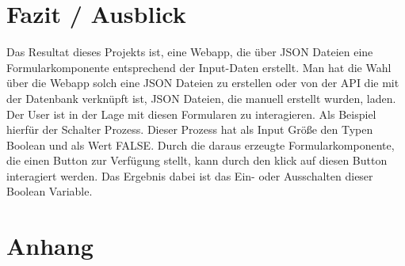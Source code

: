 \documentclass[a4paper,11pt]{scrreprt}
\begin{document}
\chapter{Fazit / Ausblick}
Das Resultat dieses Projekts ist, eine Webapp, die über JSON Dateien eine Formularkomponente entsprechend der Input-Daten erstellt. Man hat die Wahl über  die Webapp solch eine JSON Dateien zu erstellen oder von der API die mit der Datenbank verknüpft ist, JSON Dateien, die manuell erstellt wurden, laden. Der User ist in der Lage mit diesen Formularen zu interagieren. Als Beispiel hierfür der Schalter Prozess. Dieser Prozess hat als Input Größe den Typen Boolean und als Wert FALSE. Durch die daraus erzeugte Formularkomponente, die einen Button zur Verfügung stellt, kann durch den klick auf diesen Button interagiert werden. Das Ergebnis dabei ist das Ein- oder Ausschalten dieser Boolean Variable.



\chapter{Anhang}

\newpage
\listoffigures

\newpage

\end{document}
